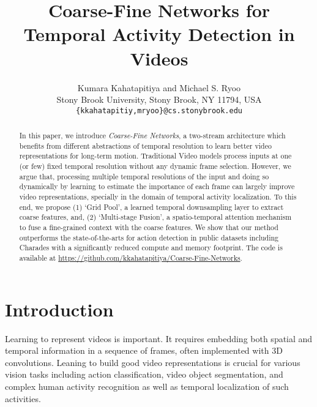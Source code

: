 \documentclass[final]{cvpr}
\begin{document}
\title{Coarse-Fine Networks for Temporal Activity Detection in Videos \vspace{-6mm}}

\author{Kumara Kahatapitiya and Michael S. Ryoo\\
Stony Brook University, Stony Brook, NY 11794, USA\\
{\tt\small \{kkahatapitiy,mryoo\}@cs.stonybrook.edu}\vspace{-4mm}
}

\maketitle


\begin{abstract}
    \vspace{-2mm}
   In this paper, we introduce \emph{Coarse-Fine Networks}, a two-stream architecture which benefits from different abstractions of temporal resolution to learn better video representations for long-term motion. Traditional Video models process inputs at one (or few) fixed temporal resolution without any dynamic frame selection. However, we argue that, processing multiple temporal resolutions of the input and doing so dynamically by learning to estimate the importance of each frame can largely improve video representations, specially in the domain of temporal activity localization. To this end, we propose (1) `Grid Pool', a learned temporal downsampling layer to extract coarse features, and, (2) `Multi-stage Fusion', a spatio-temporal attention mechanism to fuse a fine-grained context with the coarse features. We show that our method outperforms the state-of-the-arts for action detection in public datasets including Charades with a significantly reduced compute and memory footprint. The code is available at \href{https://github.com/kkahatapitiya/Coarse-Fine-Networks}{https://github.com/kkahatapitiya/Coarse-Fine-Networks}.
   \vspace{-6mm}
\end{abstract}

\section{Introduction}
\vspace{-1mm}







Learning to represent videos is important. It requires embedding both spatial and temporal information in a sequence of frames, often implemented with 3D convolutions. Leaning to build good video representations is crucial for various vision tasks including action classification, video object segmentation, and complex human activity recognition as well as temporal localization of such activities.
\end{document}
